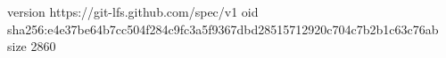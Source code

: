 version https://git-lfs.github.com/spec/v1
oid sha256:e4e37be64b7cc504f284c9fc3a5f9367dbd28515712920c704c7b2b1c63c76ab
size 2860
